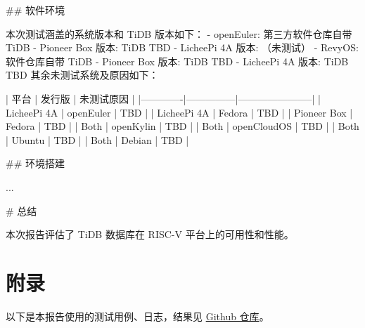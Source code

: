 \documentclass{article}
\begin{document}
\begin{markdown}
## 软件环境

本次测试涵盖的系统版本和 TiDB 版本如下：
- openEuler: 第三方软件仓库自带 TiDB 
  - Pioneer Box 版本: TiDB TBD
  - LicheePi 4A 版本: （未测试）
- RevyOS: 软件仓库自带 TiDB
  - Pioneer Box 版本: TiDB TBD
  - LicheePi 4A 版本: TiDB TBD
  其余未测试系统及原因如下：

  | 平台        | 发行版        | 未测试原因              |
  |-------------|---------------|-----------------------|
  | LicheePi 4A | openEuler     | TBD                   |
  | LicheePi 4A | Fedora        | TBD                   |
  | Pioneer Box | Fedora        | TBD                   |
  | Both        | openKylin     | TBD                   |
  | Both        | openCloudOS   | TBD                   |
  | Both        | Ubuntu        | TBD                   |
  | Both        | Debian        | TBD                   |

## 环境搭建

...

# 总结

本次报告评估了 TiDB 数据库在 RISC-V 平台上的可用性和性能。

\end{markdown}

\newpage
\section{附录}

\appendix

以下是本报告使用的测试用例、日志，结果见 \href{https://github.com/QA-Team-lo/dbtest}{Github 仓库}。


\end{document}
